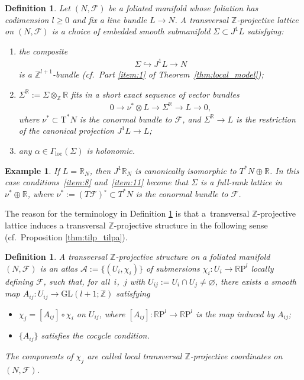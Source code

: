 \documentclass[pdftex]{sigma}
\numberwithin{equation}{section}
\newtheorem{Definition}[Theorem]{Definition}
\newtheorem{Example}[Theorem]{Example}
\newcommand{\cotan}{\mathrm{T}^*} %
\newcommand{\RR}{\mathbb{R}}
\newcommand{\ZZ}{\mathbb{Z}}
\begin{document}
\begin{Definition}\label{defn:tilp}
Let $(N,\mathcal{F})$ be a foliated manifold whose foliation has codimension $l \geq 0$ and f\/ix a line bundle $L \to N$. A {\it transversal $\ZZ$-projective lattice} on $(N,\mathcal{F})$ is a choice of embedded smooth submanifold $\Sigma\subset J^1L$ satisfying:
 \begin{enumerate}[label=(T\arabic*), ref=(T\arabic*)]\itemsep=0pt
 \item\label{item:8} the composite
 \begin{gather*}
 \Sigma\hookrightarrow J^1L\to N
 \end{gather*}
 is a $\ZZ^{l+1}$-bundle (cf.\ Part \ref{item:1} of Theorem~\ref{thm:local_model});
 \item \label{item:11} $\Sigma^{\RR} := \Sigma \otimes_{\ZZ} \RR$ f\/its in a short exact sequence of vector bundles
 \begin{gather*}
 0 \to \nu^* \otimes L \to \Sigma^{\RR} \to L \to 0,
 \end{gather*}
where $\nu^* \subset \cotan N$ is the conormal bundle to $\mathcal{F}$, and $\Sigma^{\RR} \to L$ is the restriction of the canonical projection $J^1 L \to L$;
 \item\label{item:9} any $\alpha \in \Gamma_{\mathrm{loc}}(\Sigma)$ is holonomic.
 \end{enumerate}
\end{Definition}

\begin{Example}\label{exm:trivial_bundle} If $L = \RR_N$, then $J^1\RR_N$ is canonically isomorphic to $T^*N \oplus \RR$. In this case conditions~\ref{item:8} and~\ref{item:11} become that $\Sigma$ is a full-rank lattice in $\nu^* \oplus \RR$, where $\nu^* :=\left(T\mathcal{F}\right)^{\circ}\subset T^*N$ is the conormal bundle to $\mathcal{F}$.
\end{Example}

The reason for the terminology in Def\/inition \ref{defn:tilp} is that a~transversal $\ZZ$-projective lattice induces a transversal $\ZZ$-projective structure in the following sense (cf.\ Proposition \ref{thm:tilp_tilpa}).

\begin{Definition}\label{defn:tipa} A {\it transversal $\ZZ$-projective structure} on a foliated manifold $(N,\mathcal{F})$ is an atlas $\mathcal{A}
 :=\{(U_i, \chi_i)\}$ of submersions $\chi_i \colon U_i \to \RR\mathrm{P}^l$ locally def\/ining $\mathcal{F}$, such that, for all~$i$,~$j$ with $U_{ij} := U_i \cap U_j \neq \varnothing$, there exists a smooth map $A_{ij}\colon U_{ij} \to \mathrm{GL}(l+1;\ZZ)$ satisfying
 \begin{itemize}\itemsep=0pt
 \item $\chi_j = [A_{ij}]\circ \chi_i$ on $U_{ij}$, where $[A_{ij}] \colon \RR \mathrm{P}^l \to \RR \mathrm{P}^l$ is the map induced by $A_{ij}$;
 \item $\{A_{ij}\}$ satisf\/ies the cocycle condition.
 \end{itemize}
The components of $\chi_j$ are called {\em local transversal $\ZZ$-projective coordinates} on $(N,\mathcal{F})$.
\end{Definition}
\end{document}
